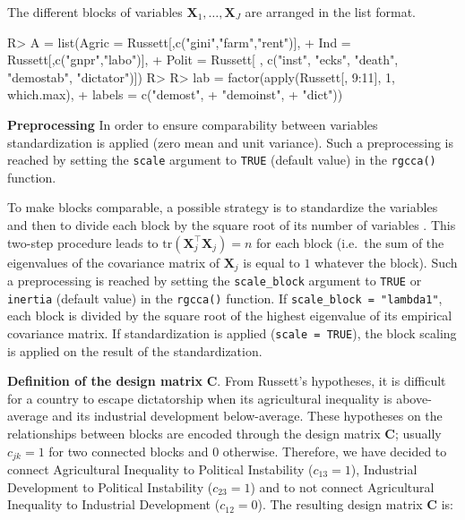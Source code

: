 \documentclass[
]{jss}
\begin{document}
The different blocks of variables
\(\ensuremath{\mathbf{X}}_1, \ldots, \ensuremath{\mathbf{X}}_J\) are
arranged in the list format.

\footnotesize

\begin{CodeChunk}
\begin{CodeInput}
R> A = list(Agric = Russett[,c("gini","farm","rent")], 
+          Ind = Russett[,c("gnpr","labo")], 
+          Polit = Russett[ , c("inst", "ecks",  "death", "demostab", "dictator")])
R> 
R> lab = factor(apply(Russett[, 9:11], 1, which.max),
+              labels = c("demost", 
+                         "demoinst", 
+                         "dict"))
\end{CodeInput}
\end{CodeChunk}

\normalsize

\textbf{Preprocessing} In order to ensure comparability between
variables standardization is applied (zero mean and unit variance). Such
a preprocessing is reached by setting the \texttt{scale} argument to
\texttt{TRUE} (default value) in the \texttt{rgcca()} function.

To make blocks comparable, a possible strategy is to standardize the
variables and then to divide each block by the square root of its number
of variables \citep{Westerhuis1998}. This two-step procedure leads to
\(\mathrm{tr}(\ensuremath{\mathbf{X}}_j^\top \ensuremath{\mathbf{X}}_j )=n\)
for each block (i.e.~the sum of the eigenvalues of the covariance matrix
of \(\ensuremath{\mathbf{X}}_j\) is equal to \(1\) whatever the block).
Such a preprocessing is reached by setting the \texttt{scale\_block}
argument to \texttt{TRUE} or \texttt{inertia} (default value) in the
\texttt{rgcca()} function. If \texttt{scale\_block\ =\ "lambda1"}, each
block is divided by the square root of the highest eigenvalue of its
empirical covariance matrix. If standardization is applied
(\texttt{scale\ =\ TRUE}), the block scaling is applied on the result of
the standardization.

\textbf{Definition of the design matrix} \(\mathbf{C}\). From Russett's
hypotheses, it is difficult for a country to escape dictatorship when
its agricultural inequality is above-average and its industrial
development below-average. These hypotheses on the relationships between
blocks are encoded through the design matrix \(\mathbf{C}\); usually
\(c_{jk} = 1\) for two connected blocks and \(0\) otherwise. Therefore,
we have decided to connect Agricultural Inequality to Political
Instability (\(c_{13} = 1\)), Industrial Development to Political
Instability (\(c_{23} = 1\)) and to not connect Agricultural Inequality
to Industrial Development (\(c_{12} = 0\)). The resulting design matrix
\(\ensuremath{\mathbf{C}}\) is:
\end{document}
